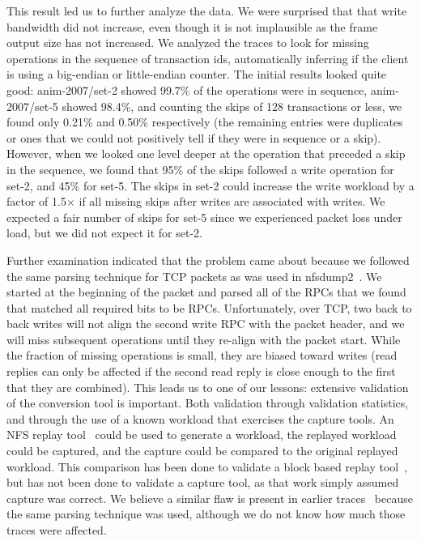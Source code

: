 This result led us to further analyze the data.  We were surprised
that that write bandwidth did not increase, even though it is not
implausible as the frame output size has not increased.  We analyzed
the traces to look for missing operations in the sequence of
transaction ids, automatically inferring if the client is using a
big-endian or little-endian counter.  The initial results looked quite
good: anim-2007/set-2 showed 99.7\% of the operations were in sequence,
anim-2007/set-5 showed 98.4\%, and counting the skips of 128 transactions
or less, we found only 0.21\% and 0.50\% respectively (the remaining
entries were duplicates or ones that we could not positively tell if
they were in sequence or a skip).  However, when we looked one level
deeper at the operation that preceded a skip in the sequence, we found
that 95\% of the skips followed a write operation for set-2, and 45\%
for set-5.  The skips in set-2 could increase the write workload by a
factor of 1.5$\times$ if all missing skips after writes are associated with
writes.  We expected a fair number of skips for set-5 since we
experienced packet loss under load, but we did not expect it for
set-2. 

Further examination indicated that the problem came about because we
followed the same parsing technique for TCP packets as was used in
nfsdump2~\cite{ellardTraces}.  We started at the beginning of the
packet and parsed all of the RPCs that we found that matched all
required bits to be RPCs.  Unfortunately, over TCP, two back to back
writes will not align the second write RPC with the packet header, and
we will miss subsequent operations until they re-align with the packet
start.  While the fraction of missing operations is small, they are
biased toward writes (read replies can only be affected if the second
read reply is close enough to the first that they are combined).  This
leads us to one of our lessons: extensive validation of the conversion
tool is important.  Both validation through validation statistics, and
through the use of a known workload that exercises the capture tools.
An NFS replay tool~\cite{NingningFast05} could be used to
generate a workload, the replayed workload could be captured, and the
capture could be compared to the original replayed workload.
This comparison has been done to validate a block based replay
tool~\cite{AndersonFast04}, but has not been done to validate a
capture tool, as that work simply assumed capture was correct.
We believe a similar
flaw is present in earlier traces~\cite{ellardTraces} because the same
parsing technique was used, although we do not know how much those traces were
affected.

